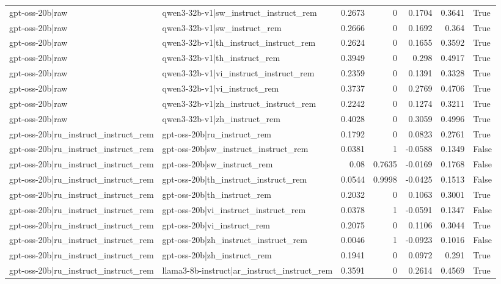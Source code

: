 \begin{table}
\begin{tabular}{l l r r r r l}
gpt-oss-20b|raw & qwen3-32b-v1|sw_instruct_instruct_rem & 0.2673 & 0 & 0.1704 & 0.3641 & True \\
gpt-oss-20b|raw & qwen3-32b-v1|sw_instruct_rem & 0.2666 & 0 & 0.1692 & 0.364 & True \\
gpt-oss-20b|raw & qwen3-32b-v1|th_instruct_instruct_rem & 0.2624 & 0 & 0.1655 & 0.3592 & True \\
gpt-oss-20b|raw & qwen3-32b-v1|th_instruct_rem & 0.3949 & 0 & 0.298 & 0.4917 & True \\
gpt-oss-20b|raw & qwen3-32b-v1|vi_instruct_instruct_rem & 0.2359 & 0 & 0.1391 & 0.3328 & True \\
gpt-oss-20b|raw & qwen3-32b-v1|vi_instruct_rem & 0.3737 & 0 & 0.2769 & 0.4706 & True \\
gpt-oss-20b|raw & qwen3-32b-v1|zh_instruct_instruct_rem & 0.2242 & 0 & 0.1274 & 0.3211 & True \\
gpt-oss-20b|raw & qwen3-32b-v1|zh_instruct_rem & 0.4028 & 0 & 0.3059 & 0.4996 & True \\
gpt-oss-20b|ru_instruct_instruct_rem & gpt-oss-20b|ru_instruct_rem & 0.1792 & 0 & 0.0823 & 0.2761 & True \\
gpt-oss-20b|ru_instruct_instruct_rem & gpt-oss-20b|sw_instruct_instruct_rem & 0.0381 & 1 & -0.0588 & 0.1349 & False \\
gpt-oss-20b|ru_instruct_instruct_rem & gpt-oss-20b|sw_instruct_rem & 0.08 & 0.7635 & -0.0169 & 0.1768 & False \\
gpt-oss-20b|ru_instruct_instruct_rem & gpt-oss-20b|th_instruct_instruct_rem & 0.0544 & 0.9998 & -0.0425 & 0.1513 & False \\
gpt-oss-20b|ru_instruct_instruct_rem & gpt-oss-20b|th_instruct_rem & 0.2032 & 0 & 0.1063 & 0.3001 & True \\
gpt-oss-20b|ru_instruct_instruct_rem & gpt-oss-20b|vi_instruct_instruct_rem & 0.0378 & 1 & -0.0591 & 0.1347 & False \\
gpt-oss-20b|ru_instruct_instruct_rem & gpt-oss-20b|vi_instruct_rem & 0.2075 & 0 & 0.1106 & 0.3044 & True \\
gpt-oss-20b|ru_instruct_instruct_rem & gpt-oss-20b|zh_instruct_instruct_rem & 0.0046 & 1 & -0.0923 & 0.1016 & False \\
gpt-oss-20b|ru_instruct_instruct_rem & gpt-oss-20b|zh_instruct_rem & 0.1941 & 0 & 0.0972 & 0.291 & True \\
gpt-oss-20b|ru_instruct_instruct_rem & llama3-8b-instruct|ar_instruct_instruct_rem & 0.3591 & 0 & 0.2614 & 0.4569 & True \\

\end{tabular}
\end{table}
